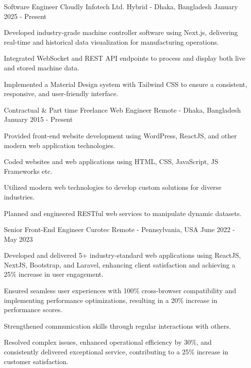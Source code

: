 
\begin{cventries}

    \cventry
        {Software Engineer}
        {Cloudly Infotech Ltd.}
        {Hybrid - Dhaka, Bangladesh}
        {January 2025 - Present}
        {
            \begin{cvitems}
                \item {Developed industry-grade machine controller software using Next.js, delivering real-time and historical data visualization for manufacturing operations.}
                \item {Integrated WebSocket and REST API endpoints to process and display both live and stored machine data.}
                \item {Implemented a Material Design system with Tailwind CSS to ensure a consistent, responsive, and user-friendly interface.}
            \end{cvitems}
        }

    \cventry
        {Contractual \& Part time}
        {Freelance Web Engineer}
        {Remote - Dhaka, Bangladesh}
        {January 2015 - Present}
        {
            \begin{cvitems}
                \item {Provided front-end website development using WordPress, ReactJS, and other modern web application technologies.}
                \item {Coded websites and web applications using HTML, CSS, JavaScript, JS Frameworks etc.}
                \item {Utilized modern web technologies to develop custom solutions for diverse industries.}
                \item {Planned and engineered RESTful web services to manipulate dynamic datasets.}
            \end{cvitems}
        }

    \cventry
        {Senior Front-End Engineer}
        {Curotec}
        {Remote - Pennsylvania, USA}
        {June 2022 - May 2023}
        {
            \begin{cvitems}
                \item {Developed and delivered 5+ industry-standard web applications using ReactJS, NextJS, Bootstrap, and Laravel, enhancing client satisfaction and achieving a 25\% increase in user engagement.}
                \item {Ensured seamless user experiences with 100\% cross-browser compatibility and implementing performance optimizations, resulting in a 20\% increase in performance scores.}
                \item {Strengthened communication skills through regular interactions with others.}
                \item {Resolved complex issues, enhanced operational efficiency by 30\%, and consistently delivered exceptional service, contributing to a 25\% increase in customer satisfaction.}
            \end{cvitems}
        }


\end{cventries}

